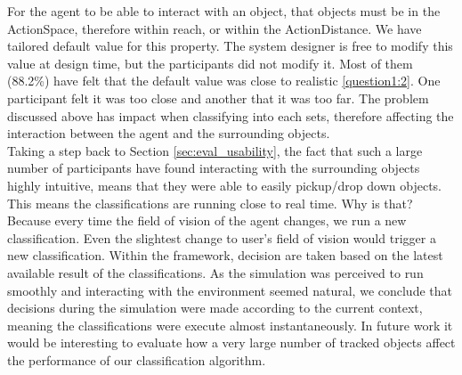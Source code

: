 For the agent to be able to interact with an object, that objects must be in the ActionSpace, therefore within reach, or within the ActionDistance. We have tailored default value for this property. The system designer is free to modify this value at design time, but the participants did not modify it. Most of them (88.2\%) have felt that the default value was close to realistic \ref{question1:2}. One participant felt it was too close and another that it was too far. The problem discussed above has impact when classifying into each sets, therefore affecting the interaction between the agent and the surrounding objects.\\

Taking a step back to Section \ref{sec:eval_usability}, the fact that such a large number of participants have found interacting with the surrounding objects highly intuitive, means that they were able to easily pickup/drop down objects. This means the classifications are running close to real time. Why is that? Because every time the field of vision of the agent changes, we run a new classification. Even the slightest change to user's field of vision would trigger a new classification. Within the framework, decision are taken based on the latest available result of the classifications. As the simulation was perceived to run smoothly and interacting with the environment seemed natural, we conclude that decisions during the simulation were made according to the current context, meaning the classifications were execute almost instantaneously. In future work it would be interesting to evaluate how a very large number of tracked objects affect the performance of our classification algorithm.

